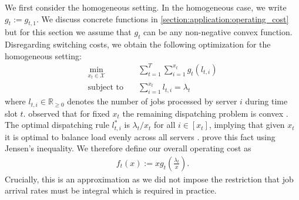 We first consider the homogeneous setting. In the homogeneous case, we write $g_t := g_{t,1}$. We discuss concrete functions in \autoref{section:application:operating_cost} but for this section we assume that $g_t$ can be any non-negative convex function. Disregarding switching costs, we obtain the following optimization for the homogeneous setting: \begin{align*}
    \min_{x_t \in \mathcal{X}} \quad &\sum_{t=1}^T \sum_{i=1}^{x_t} g_t(l_{t,i}) \\
    \text{subject to}        \quad &\sum_{i=1}^{x_t} l_{t,i} = \lambda_t
\end{align*} where $l_{t,i} \in \mathbb{R}_{\geq 0}$ denotes the number of jobs processed by server $i$ during time slot $t$. \citeauthor*{Lin2011} observed that for fixed $x_t$ the remaining dispatching problem is convex \cite{Lin2011}. The optimal dispatching rule $l_{t,i}^*$ is $\lambda_t / x_t$ for all $i \in [x_t]$, implying that given $x_t$ it is optimal to balance load evenly across all servers \cite{Albers2021_2}. \citeauthor*{Albers2021_2} prove this fact using Jensen's inequality. We therefore define our overall operating cost as \begin{align}\label{eq:homogeneous_load_balancing}
    f_t(x) := x g_t\left(\frac{\lambda_t}{x}\right).
\end{align} Crucially, this is an approximation as we did not impose the restriction that job arrival rates must be integral which is required in practice.

